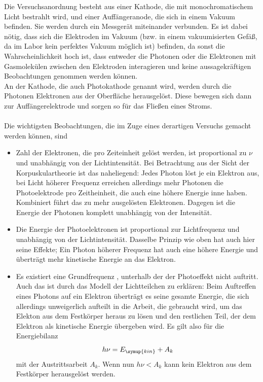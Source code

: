     \noindent Die Versuchsanordnung besteht aus einer Kathode, die mit monochromatischem Licht bestrahlt wird, und einer Auffängeranode, 
    die sich in einem Vakuum befinden. Sie werden durch ein Messgerät miteinander verbunden. Es ist dabei nötig, dass sich die Elektroden 
    im Vakuum (bzw. in einem vakuumisierten Gefäß, da im Labor kein perfektes Vakuum möglich ist) befinden, da sonst die Wahrscheinlichkeit hoch ist, dass
    entweder die Photonen oder die Elektronen mit Gasmolekülen zwischen den Elektroden interagieren und keine aussagekräftigen Beobachtungen 
    genommen werden können.\\
    An der Kathode, die auch Photokathode genannt wird, werden durch die Photonen Elektronen aus der Oberfläche herausgelöst. Diese bewegen sich
    dann zur Auffängerelektrode und sorgen so für das Fließen eines Stroms.\\
    \\
    Die wichtigsten Beobachtungen, die im Zuge eines derartigen Versuchs gemacht werden können, sind
    \begin{itemize}
        \item Zahl der Elektronen, die pro Zeiteinheit gelöst werden, ist proportional zu $\nu$ und unabhängig von der Lichtintensität. Bei Betrachtung aus der Sicht
        der Korpuskulartheorie ist das naheliegend: Jedes Photon löst je ein Elektron aus, bei Licht höherer Frequenz erreichen allerdings mehr Photonen 
        die Photoelektrode pro Zeitheinheit, die auch eine höhere Energie inne haben. Kombiniert führt das zu mehr ausgelösten Elektronen. Dagegen ist die Energie 
        der Photonen komplett unabhängig von der Intensität.
        \item  Die Energie der Photoelektronen ist proportional zur Lichtfrequenz und unabhängig von der Lichtintensität. Dasselbe Prinzip wie oben hat auch hier seine Effekte;
        Ein Photon höherer Frequenz hat auch eine höhere Energie und überträgt mehr kinetische Energie an das Elektron.
        \item Es existiert eine Grundfrequenz , unterhalb der der Photoeffekt nicht auftritt. Auch das ist durch das Modell der Lichtteilchen zu erklären: Beim Auftreffen
        eines Photons auf ein Elektron überträgt es seine gesamte Energie, die sich allerdings unweigerlich aufteilt in die Arbeit, die gebraucht wird, um das Elekton 
        aus dem Festkörper heraus zu lösen und den restlichen Teil, der dem Elektron als kinetische Energie übergeben wird. Es gilt also für die Energiebilanz
        \begin{equation}
            h \nu = E_{\symup{kin}} + A_k 
            \label{eqn:bilanz}
        \end{equation}
        mit der Austrittsarbeit $A_k$. Wenn nun $h \nu < A_k$ kann kein Elektron aus dem Festkörper herausgelöst werden.
    \end{itemize}

